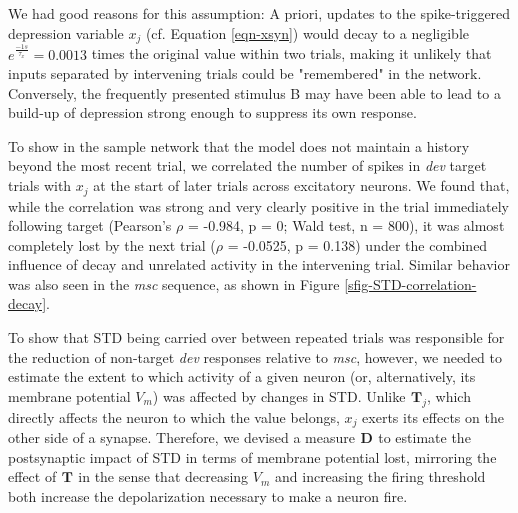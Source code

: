 \documentclass[pdflatex,referee,iicol,sn-basic]{sn-jnl}
\newcommand{\dev}{\textit{dev}}
\newcommand{\msc}{\textit{msc}}
\renewcommand{\T}[3][]{{}^{#1}_{}\mathbf{T}^{#2}_{#3}}
\newcommand{\D}[3][]{{}^{#1}_{}\!\mathbf{D}^{#2}_{#3}}
\theoremstyle{thmstyleone}%
\theoremstyle{thmstyletwo}%
\theoremstyle{thmstylethree}%
\begin{document}
We had good reasons for this assumption: A priori, updates to the spike-triggered depression variable $x_j$ (cf. Equation \ref{eqn-xsyn}) would decay to a negligible $e^\frac{-1 s}{\tau_x} = 0.0013$ times the original value within two trials, making it unlikely that inputs separated by intervening trials could be "remembered" in the network. Conversely, the frequently presented stimulus B may have been able to lead to a build-up of depression strong enough to suppress its own response.

To show in the sample network that the model does not maintain a history beyond the most recent trial, we correlated the number of spikes in \dev{} target trials with $x_j$ at the start of later trials across excitatory neurons. We found that, while the correlation was strong and very clearly positive in the trial immediately following target (Pearson's $\rho$ = -0.984, p = 0; Wald test, n = 800), it was almost completely lost by the next trial ($\rho$ = -0.0525, p = 0.138) under the combined influence of decay and unrelated activity in the intervening trial. Similar behavior was also seen in the \msc{} sequence, as shown in Figure \ref{sfig-STD-correlation-decay}.

To show that STD being carried over between repeated trials was responsible for the reduction of non-target \dev{} responses relative to \msc{}, however, we needed to estimate the extent to which activity of a given neuron (or, alternatively, its membrane potential $V_m$) was affected by changes in STD. Unlike $\T{}{j}$, which directly affects the neuron to which the value belongs, $x_j$ exerts its effects on the other side of a synapse. Therefore, we devised a measure $\D{}{}$ to estimate the postsynaptic impact of STD in terms of membrane potential lost, mirroring the effect of $\T{}{}$ in the sense that decreasing $V_m$ and increasing the firing threshold both increase the depolarization necessary to make a neuron fire.
\end{document}
